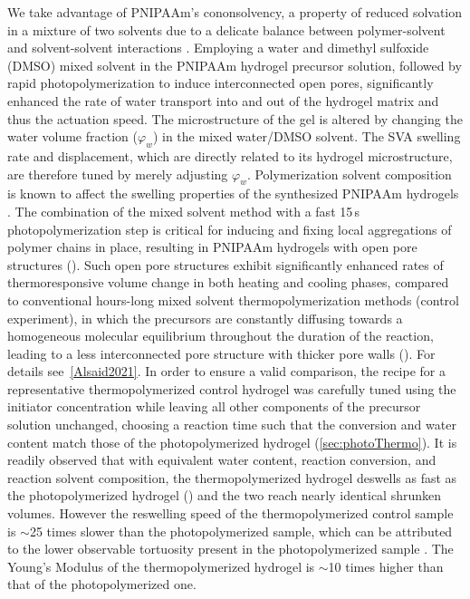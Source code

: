 We take advantage of PNIPAAm's cononsolvency, a property of reduced solvation in a mixture of two solvents due to a delicate balance between polymer-solvent and solvent-solvent interactions \cite{Pica2016}. Employing a water and dimethyl sulfoxide (DMSO) mixed solvent in the PNIPAAm hydrogel precursor solution, followed by rapid photopolymerization to induce interconnected open pores, significantly enhanced the rate of water transport into and out of the hydrogel matrix and thus the actuation speed. The microstructure of the gel is altered by changing the water volume fraction (\(\varphi_{w}\)) in the mixed water/DMSO solvent. The SVA swelling rate and displacement, which are directly related to its hydrogel microstructure, are therefore tuned by merely  adjusting \(\varphi_{w}\). Polymerization solvent composition is known to affect the swelling properties of the synthesized PNIPAAm hydrogels . 
The combination of the mixed solvent method with a fast 15\,s photopolymerization step is critical for inducing and fixing local aggregations of polymer chains in place,
resulting in PNIPAAm hydrogels with open pore structures (). Such open pore structures exhibit significantly enhanced rates of thermoresponsive volume change in both heating and cooling phases, compared to conventional hours-long mixed solvent thermopolymerization methods (control experiment), in which the precursors are constantly diffusing towards a homogeneous molecular equilibrium throughout the duration of the reaction, leading to a less interconnected pore structure with thicker pore walls (). For details see~\ref{Alsaid2021}.
In order to ensure a valid comparison, the recipe for a representative thermopolymerized control hydrogel was carefully tuned using the initiator concentration while leaving all other components of the precursor solution unchanged, choosing a reaction time such that the conversion and water content match those of the photopolymerized hydrogel (\ref{sec:photoThermo}). It is readily observed that with equivalent water content, reaction conversion, and reaction solvent composition, the thermopolymerized hydrogel deswells as fast as the photopolymerized hydrogel () and the two reach nearly identical shrunken volumes. However the reswelling speed of the thermopolymerized control sample is $\sim$25 times slower than the photopolymerized sample, which can be attributed to the lower observable tortuosity present in the photopolymerized sample . The Young's Modulus of the thermopolymerized hydrogel is $\sim$10 times higher than that of the photopolymerized one. \\

